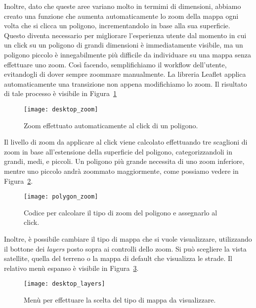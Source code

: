 Inoltre, dato che queste aree variano molto in termimi di dimensioni, abbiamo creato una funzione che aumenta automaticamente lo zoom della mappa ogni volta che si clicca un poligono, incrementandolo in base alla sua superficie. Questo diventa necessario per migliorare l'esperienza utente dal momento in cui un click su un poligono di grandi dimensioni è immediatamente visibile, ma un poligono piccolo è innegabilmente più difficile da individuare su una mappa senza effettuare uno zoom. Così facendo, semplifichiamo il workflow dell'utente, evitandogli di dover sempre zoommare manualmente. La libreria Leaflet applica automaticamente una transizione non appena modifichiamo lo zoom. Il risultato di tale processo è visibile in Figura~\ref{fig:zoom_desktop}

\begin{figure}[H]
    \centering
    \texttt{[image: desktop\_zoom]}
    \caption[Zoom automatico al click di un poligono]{Zoom effettuato automaticamente al click di un poligono.}
    \label{fig:zoom_desktop}
\end{figure}

Il livello di zoom da applicare al click viene calcolato effettuando tre scaglioni di zoom in base all'estensione della superficie del poligono, categorizzandoli in grandi, medi, e piccoli. Un poligono più grande necessita di uno zoom inferiore, mentre uno piccolo andrà zoommato maggiormente, come possiamo vedere in Figura~\ref{fig:zoom_code}.

\begin{figure}[H]
    \centering
    \texttt{[image: polygon\_zoom]}
    \caption[Codice per lo zoom al click del poligono]{Codice per calcolare il tipo di zoom del poligono e assegnarlo al click.}
    \label{fig:zoom_code}
\end{figure}

Inoltre, è possibile cambiare il tipo di mappa che si vuole visualizzare, utilizzando il bottone dei \textit{layers} posto sopra ai controlli dello zoom. Si può scegliere la vista satellite, quella del terreno o la mappa di default che visualizza le strade. Il relativo menù espanso è visibile in Figura~\ref{fig:layers}.

\begin{figure}[H]
    \centering
    \texttt{[image: desktop\_layers]}
    \caption[Menù per la scelta del tipo di mappa]{Menù per effettuare la scelta del tipo di mappa da visualizzare.}
    \label{fig:layers}
\end{figure}

